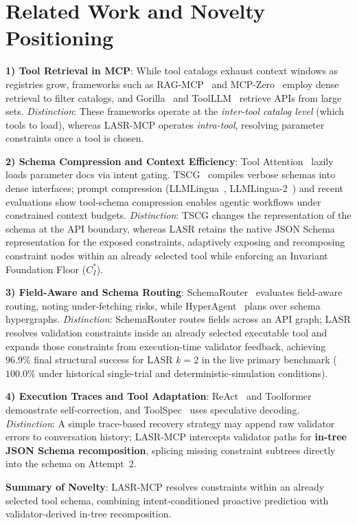 \section{Related Work and Novelty Positioning}
\label{sec:related_work}

\noindent\textbf{1) Tool Retrieval in MCP}: While tool catalogs exhaust context windows as registries grow, frameworks such as RAG-MCP~\cite{rag_mcp2024} and MCP-Zero~\cite{mcp_zero2024} employ dense retrieval to filter catalogs, and Gorilla~\cite{patil2023gorilla} and ToolLLM~\cite{qin2023toolllm} retrieve APIs from large sets. \textit{Distinction}: These frameworks operate at the \textit{inter-tool catalog level} (which tools to load), whereas LASR-MCP operates \textit{intra-tool}, resolving parameter constraints once a tool is chosen.

\noindent\textbf{2) Schema Compression and Context Efficiency}: Tool Attention~\cite{tool_attention2024} lazily loads parameter docs via intent gating. TSCG~\cite{tscg2024} compiles verbose schemas into dense interfaces; prompt compression (LLMLingua~\cite{jiang2023llmlingua}, LLMLingua-2~\cite{pan2024llmlingua2}) and recent evaluations show tool-schema compression enables agentic workflows under constrained context budgets. \textit{Distinction}: TSCG changes the representation of the schema at the API boundary, whereas LASR retains the native JSON Schema representation for the exposed constraints, adaptively exposing and recomposing constraint nodes within an already selected tool while enforcing an Invariant Foundation Floor ($C_I^*$).

\noindent\textbf{3) Field-Aware and Schema Routing}: SchemaRouter~\cite{schemarouter2024} evaluates field-aware routing, noting under-fetching risks, while HyperAgent~\cite{hyperagent2024} plans over schema hypergraphs. \textit{Distinction}: SchemaRouter routes fields across an API graph; LASR resolves validation constraints inside an already selected executable tool and expands those constraints from execution-time validator feedback, achieving $96.9\%$ final structural success for LASR $k=2$ in the live primary benchmark ($100.0\%$ under historical single-trial and deterministic-simulation conditions).

\noindent\textbf{4) Execution Traces and Tool Adaptation}: ReAct~\cite{yao2022react} and Toolformer~\cite{schick2024toolformer} demonstrate self-correction, and ToolSpec~\cite{toolspec2024} uses speculative decoding. \textit{Distinction}: A simple trace-based recovery strategy may append raw validator errors to conversation history; LASR-MCP intercepts validator paths for \textbf{in-tree JSON Schema recomposition}, splicing missing constraint subtrees directly into the schema on Attempt~2.

\noindent\textbf{Summary of Novelty}: LASR-MCP resolves constraints within an already selected tool schema, combining intent-conditioned proactive prediction with validator-derived in-tree recomposition.

